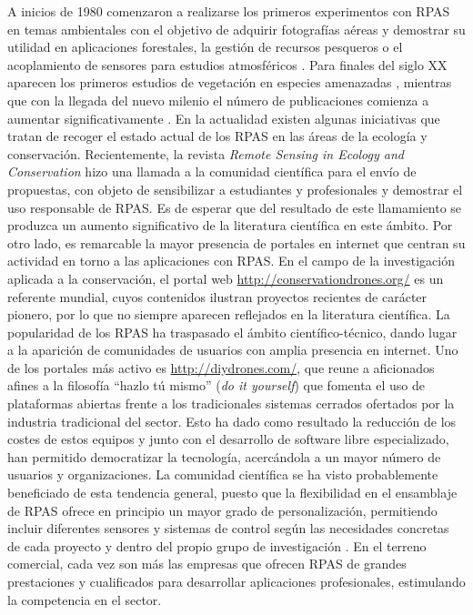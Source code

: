 \documentclass[onecolumn]{extarticle}
\begin{document}
A inicios de 1980 comenzaron a realizarse los primeros experimentos con
RPAS en temas ambientales con el objetivo de adquirir fotografías aéreas
y demostrar su utilidad en aplicaciones forestales, la gestión de
recursos pesqueros o el acoplamiento de sensores para estudios
atmosféricos \citep{Tomlins1983}. Para finales del siglo XX aparecen los
primeros estudios de vegetación en especies amenazadas
\citep{quilter1997vegetation}, mientras que con la llegada del nuevo
milenio el número de publicaciones comienza a aumentar
significativamente \citep{Hardin2013}. En la actualidad existen algunas
iniciativas que tratan de recoger el estado actual de los RPAS en las
áreas de la ecología y conservación. Recientemente, la revista
\emph{Remote Sensing in Ecology and Conservation} hizo una llamada a la
comunidad científica para el envío de propuestas, con objeto de
sensibilizar a estudiantes y profesionales y demostrar el uso
responsable de RPAS. Es de esperar que del resultado de este llamamiento
se produzca un aumento significativo de la literatura científica en este
ámbito. Por otro lado, es remarcable la mayor presencia de portales en
internet que centran su actividad en torno a las aplicaciones con RPAS.
En el campo de la investigación aplicada a la conservación, el portal
web \url{http://conservationdrones.org/} es un referente mundial, cuyos
contenidos ilustran proyectos recientes de carácter pionero, por lo que
no siempre aparecen reflejados en la literatura científica. La
popularidad de los RPAS ha traspasado el ámbito científico-técnico,
dando lugar a la aparición de comunidades de usuarios con amplia
presencia en internet. Uno de los portales más activo es
\url{http://diydrones.com/}, que reune a aficionados afines a la
filosofía ``hazlo tú mismo'' (\emph{do it yourself}) que fomenta el uso
de plataformas abiertas frente a los tradicionales sistemas cerrados
ofertados por la industria tradicional del sector. Esto ha dado como
resultado la reducción de los costes de estos equipos y junto con el
desarrollo de software libre especializado, han permitido democratizar
la tecnología, acercándola a un mayor número de usuarios y
organizaciones. La comunidad científica se ha visto probablemente
beneficiado de esta tendencia general, puesto que la flexibilidad en el
ensamblaje de RPAS ofrece en principio un mayor grado de
personalización, permitiendo incluir diferentes sensores y sistemas de
control según las necesidades concretas de cada proyecto y dentro del
propio grupo de investigación \citep{Koh2012}. En el terreno comercial,
cada vez son más las empresas que ofrecen RPAS de grandes prestaciones y
cualificados para desarrollar aplicaciones profesionales, estimulando la
competencia en el sector.
\end{document}
